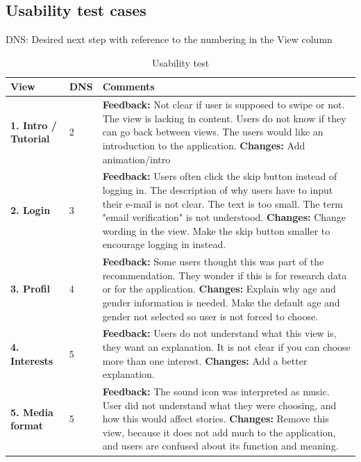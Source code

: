 \begin{appendices}
\clearpage
\section{Usability test cases}
\label{app:usabilitytest}
DNS: Desired next step with reference to the numbering in the View column\\
\renewcommand{\arraystretch}{2}%
\begin{center}
	\small
	\begin{longtable}{ | p{3.7cm} | p{1cm} | p{13cm}|}
		\caption[Usability test]{Usability test } \label{Tab:usabilityTest}\\
		\hline
		\textbf{View} & \textbf{DNS} & \textbf{Comments}
		\\ \hline
		
		\textbf{1. Intro / Tutorial} & 2 & 
		\textbf{Feedback:} Not clear if user is supposed to swipe or not. The view is lacking in content. Users do not know if they can go back between views. The users would like an introduction to the application.\newline
		\textbf{Changes:} Add animation/intro
		\\\hline
		
		\textbf{2. Login} & 3  & 
		\textbf{Feedback:} Users often click the skip button instead of logging in. The description of why users have to input their e-mail is not clear. The text is too small. The term "email verification" is not understood.\newline
		\textbf{Changes:} Change wording in the view. Make the skip button smaller to encourage logging in instead.
		\\\hline
		
		\textbf{3. Profil} & 4 & 
		\textbf{Feedback:} Some users thought this was part of the recommendation. They wonder if this is for research data or for the application.\newline
		\textbf{Changes:} Explain why age and gender information is needed. Make the default age and gender not selected so user is not forced to choose.
		\\\hline
		
		\textbf{4. Interests} & 5  & 
		\textbf{Feedback:} Users do not understand what this view is, they want an explanation. It is not clear if you can choose more than one interest.\newline		
		\textbf{Changes:} Add a better explanation.
		\\\hline
		
		\textbf{5. Media format} & 5 & 
		\textbf{Feedback:} The sound icon was interpreted as music. User did not understand what they were choosing, and how this would affect stories.\newline
		\textbf{Changes:} Remove this view, because it does not add much to the application, and users are confused about its function and meaning.
		\\\hline
		

\end{longtable}
\end{center}
\end{appendices}
